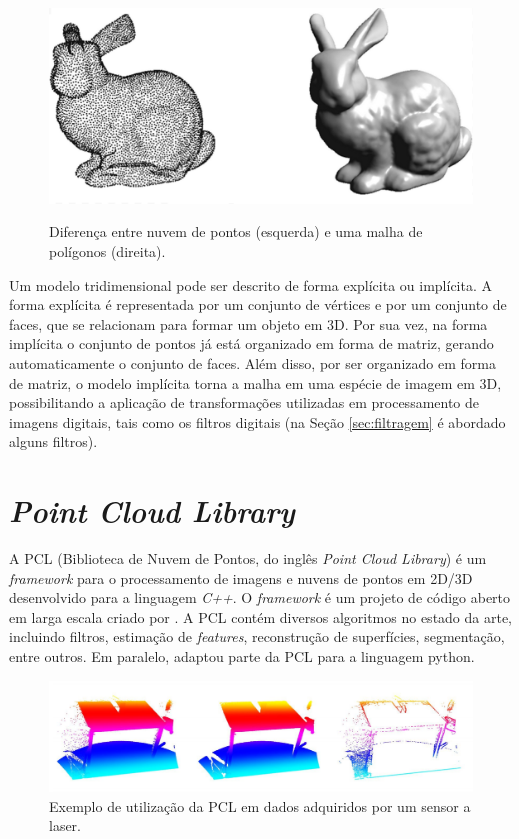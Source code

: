 \begin{figure}[H]
    \centering
    \caption{Diferença entre nuvem de pontos (esquerda) e uma malha de polígonos (direita).}
    \includegraphics[scale=0.3]{dados/figuras/bunny_example.png}
    \label{fig:bunny_example}
\end{figure}

Um modelo tridimensional pode ser descrito de forma explícita ou implícita.
A forma explícita é representada por um conjunto de vértices e por um conjunto de faces, que se relacionam para formar um objeto em 3D.
Por sua vez, na forma implícita o conjunto de pontos já está organizado em forma de matriz, gerando automaticamente o conjunto de faces. 
Além disso, por ser organizado em forma de matriz, o modelo implícita torna a malha em uma espécie de imagem em 3D, possibilitando a aplicação de transformações utilizadas em processamento de imagens digitais, tais como os filtros digitais (na Seção \ref{sec:filtragem} é abordado alguns filtros). 


\section{\textit{Point Cloud Library}}
\label{sec:pcl}

A PCL (Biblioteca de Nuvem de Pontos, do inglês \textit{Point Cloud Library}) é um \textit{framework} para o processamento de imagens e nuvens de pontos em 2D/3D desenvolvido para a linguagem \textit{C++}. 
O \textit{framework} é um projeto de código aberto em larga escala criado por \cite{rusu2011pcl}. 
A PCL contém diversos algoritmos no estado da arte, incluindo filtros, estimação de \textit{features}, reconstrução de superfícies, segmentação, entre outros. 
Em paralelo, \cite{strawlab2012} adaptou parte da PCL para a linguagem python. 

\begin{figure}[H]
    \centering
    \caption{Exemplo de utilização da PCL em dados adquiridos por um sensor a laser.}
    \label{fig:pcl_example}
    \includegraphics[scale=0.3]{dados/figuras/pcl_example.png}
\end{figure}

